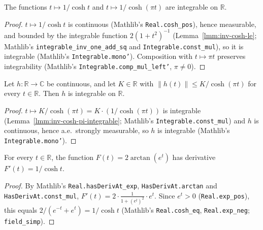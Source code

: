 \begin{lemma}
    \label{lmm:inv-cosh-pi-integrable}
    \leanok
    The functions $t \mapsto 1/\cosh t$ and $t \mapsto 1/\cosh(\pi t)$ are integrable on $\mathbb{R}$.
\end{lemma}
\begin{proof}
    \leanok
    $t \mapsto 1/\cosh t$ is continuous (Mathlib's \texttt{Real.cosh\_pos}), hence measurable, and bounded by the integrable function $2(1 + t^2)^{-1}$ (Lemma~\ref{lmm:inv-cosh-le}; Mathlib's \texttt{integrable\_inv\_one\_add\_sq} and \texttt{Integrable.const\_mul}), so it is integrable (Mathlib's \texttt{Integrable.mono'}). Composition with $t \mapsto \pi t$ preserves integrability (Mathlib's \texttt{Integrable.comp\_mul\_left'}, $\pi \ne 0$).
\end{proof}

\begin{lemma}
    \label{lmm:cosh-dominated-integrable}
    \leanok
    Let $h : \mathbb{R} \to \mathbb{C}$ be continuous, and let $K \in \mathbb{R}$ with $\|h(t)\| \le K/\cosh(\pi t)$ for every $t \in \mathbb{R}$. Then $h$ is integrable on $\mathbb{R}$.
\end{lemma}
\begin{proof}
    \leanok
    $t \mapsto K/\cosh(\pi t) = K \cdot (1/\cosh(\pi t))$ is integrable (Lemma~\ref{lmm:inv-cosh-pi-integrable}; Mathlib's \texttt{Integrable.const\_mul}) and $h$ is continuous, hence a.e.\ strongly measurable, so $h$ is integrable (Mathlib's \texttt{Integrable.mono'}).
\end{proof}

\begin{lemma}
    \label{lmm:hasDerivAt-two-arctan-exp}
    \leanok
    For every $t \in \mathbb{R}$, the function $F(t) = 2\arctan(e^t)$ has derivative $F'(t) = 1/\cosh t$.
\end{lemma}
\begin{proof}
    \leanok
    By Mathlib's \texttt{Real.hasDerivAt\_exp}, \texttt{HasDerivAt.arctan} and \texttt{HasDerivAt.const\_mul}, $F'(t) = 2 \cdot \frac{1}{1 + (e^t)^2} \cdot e^t$. Since $e^t > 0$ (\texttt{Real.exp\_pos}), this equals $2/(e^{-t} + e^t) = 1/\cosh t$ (Mathlib's \texttt{Real.cosh\_eq}, \texttt{Real.exp\_neg}; \texttt{field\_simp}).
\end{proof}

